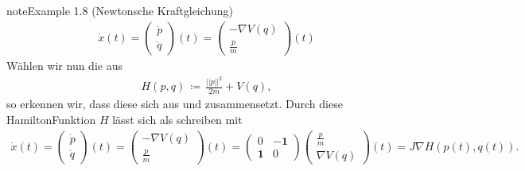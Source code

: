 \documentclass[letterpaper,10pt,english]{jupyterBook}
\begin{document}
\begin{sphinxadmonition}{note}{Example 1.8 (Newtonsche Kraftgleichung)}
\begin{equation}\label{equation:ode/hamilton:eq:newton_DGL}
\begin{split}\dot{x}(t) = \begin{pmatrix} \dot{p} \\ \dot{q} \end{pmatrix}(t) = \begin{pmatrix} -\nabla V(q) \\ \frac{p}{m} \end{pmatrix}(t)\end{split}
\end{equation}
\sphinxAtStartPar
Wählen wir nun die  aus {\hyperref[\detokenize{ode/hamilton:def:hamiltonsch}]{}}
\begin{equation*}
\begin{split}H(p,q) \, \coloneqq \, \frac{||p||^2}{2m} + V(q),\end{split}
\end{equation*}
\sphinxAtStartPar
so erkennen wir, dass diese sich aus  und  zusammensetzt.
Durch diese Hamilton\sphinxhyphen{}Funktion \(H\) lässt sich {\hyperref[\detokenize{ode/hamilton:equation-eq-newton}]{}} als  schreiben mit
\begin{equation*}
\begin{split}\dot{x}(t) = \begin{pmatrix}\dot{p} \\ \dot{q} \end{pmatrix}(t) = \begin{pmatrix} -\nabla V(q) \\ \frac{p}{m} \end{pmatrix}(t) = \begin{pmatrix}0 & -\mathbf{1}\\ \mathbf{1} & 0 \end{pmatrix} \begin{pmatrix} \frac{p}{m} \\ \nabla V(q) \end{pmatrix}(t) = J \nabla H(p(t),q(t)).\end{split}
\end{equation*}\end{sphinxadmonition}
\end{document}
